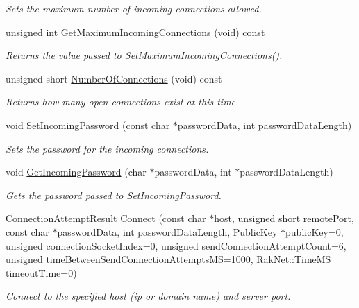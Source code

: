 \begin{DoxyCompactItemize}
\begin{DoxyCompactList}\small\item\em Sets the maximum number of incoming connections allowed. \end{DoxyCompactList}\item 
unsigned int \hyperlink{class_rak_net_1_1_rak_peer_a21eac8d486bbcb12e350c49c43c92618}{Get\-Maximum\-Incoming\-Connections} (void) const 
\begin{DoxyCompactList}\small\item\em Returns the value passed to \hyperlink{class_rak_net_1_1_rak_peer_a8ed81856dd81ec1cd00e17fafedee0a7}{Set\-Maximum\-Incoming\-Connections()}. \end{DoxyCompactList}\item 
unsigned short \hyperlink{class_rak_net_1_1_rak_peer_a4d47b849ba6e7ecf2d1fca3198a60ba5}{Number\-Of\-Connections} (void) const 
\begin{DoxyCompactList}\small\item\em Returns how many open connections exist at this time. \end{DoxyCompactList}\item 
void \hyperlink{class_rak_net_1_1_rak_peer_a6d4071bbbf128604c94a27c46fa7b9ce}{Set\-Incoming\-Password} (const char $\ast$password\-Data, int password\-Data\-Length)
\begin{DoxyCompactList}\small\item\em Sets the password for the incoming connections. \end{DoxyCompactList}\item 
void \hyperlink{class_rak_net_1_1_rak_peer_a395e269dce0de14f22bfb870923f22b3}{Get\-Incoming\-Password} (char $\ast$password\-Data, int $\ast$password\-Data\-Length)
\begin{DoxyCompactList}\small\item\em Gets the password passed to Set\-Incoming\-Password. \end{DoxyCompactList}\item 
Connection\-Attempt\-Result \hyperlink{class_rak_net_1_1_rak_peer_a19979ff2acc15abe22785fc55c1c656c}{Connect} (const char $\ast$host, unsigned short remote\-Port, const char $\ast$password\-Data, int password\-Data\-Length, \hyperlink{struct_rak_net_1_1_public_key}{Public\-Key} $\ast$public\-Key=0, unsigned connection\-Socket\-Index=0, unsigned send\-Connection\-Attempt\-Count=6, unsigned time\-Between\-Send\-Connection\-Attempts\-M\-S=1000, Rak\-Net\-::\-Time\-M\-S timeout\-Time=0)
\begin{DoxyCompactList}\small\item\em Connect to the specified host (ip or domain name) and server port. \end{DoxyCompactList}\item 

\end{DoxyCompactItemize}

